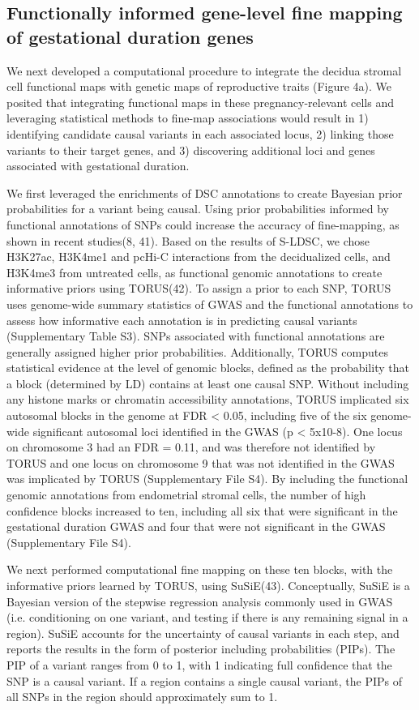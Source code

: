 \subsection{Functionally informed gene-level fine mapping of gestational duration genes}


We next developed a computational procedure to integrate the decidua stromal cell functional maps with genetic maps of reproductive traits (Figure 4a). We posited that integrating functional maps in these pregnancy-relevant cells and leveraging statistical methods to fine-map associations would result in 1) identifying candidate causal variants in each associated locus, 2) linking those variants to their target genes, and 3) discovering additional loci and genes associated with gestational duration. 

We first leveraged the enrichments of DSC annotations to create Bayesian prior probabilities for a variant being causal. Using prior probabilities informed by functional annotations of SNPs could increase the accuracy of fine-mapping, as shown in recent studies(8, 41). Based on the results of S-LDSC, we chose H3K27ac, H3K4me1 and pcHi-C interactions from the decidualized cells, and H3K4me3 from untreated cells, as functional genomic annotations to create informative priors using TORUS(42). To assign a prior to each SNP, TORUS uses genome-wide summary statistics of GWAS and the functional annotations to assess how informative each annotation is in predicting causal variants (Supplementary Table S3). SNPs associated with functional annotations are generally assigned higher prior probabilities. Additionally, TORUS computes statistical evidence at the level of genomic blocks, defined as the probability that a block (determined by LD) contains at least one causal SNP. Without including any histone marks or chromatin accessibility annotations, TORUS implicated six autosomal blocks in the genome at FDR < 0.05, including five of the six genome-wide significant autosomal loci identified in the GWAS (p < 5x10-8). One locus on chromosome 3 had an FDR = 0.11, and was therefore not identified by TORUS and one locus on chromosome 9 that was not identified in the GWAS was implicated by TORUS (Supplementary File S4). By including the functional genomic annotations from endometrial stromal cells, the number of high confidence blocks increased to ten, including all six that were significant in the gestational duration GWAS and four that were not significant in the GWAS (Supplementary File S4).  

We next performed computational fine mapping on these ten blocks, with the informative priors learned by TORUS, using SuSiE(43). Conceptually, SuSiE is a Bayesian version of the stepwise regression analysis commonly used in GWAS (i.e. conditioning on one variant, and testing if there is any remaining signal in a region). SuSiE accounts for the uncertainty of causal variants in each step, and reports the results in the form of posterior including probabilities (PIPs). The PIP of a variant ranges from 0 to 1, with 1 indicating full confidence that the SNP is a causal variant. If a region contains a single causal variant, the PIPs of all SNPs in the region should approximately sum to 1.  

